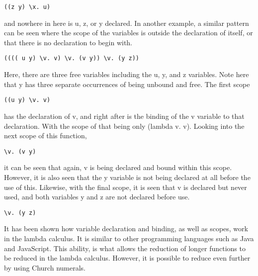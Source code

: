 \documentclass{article}
\begin{document}
\begin{lstlisting}
((z y) \x. u)
\end{lstlisting}
and nowhere in here is u, z, or y declared.
In another example, a similar pattern can be seen where the scope of the variables is outside the declaration of itself, or that there is no declaration to begin with.
\begin{lstlisting}
(((( u y) \v. v) \v. (v y)) \v. (y z))
\end{lstlisting}
Here, there are three free variables including the u, y, and z variables.
Note here that y has three separate occurrences of being unbound and free.
The first scope
\begin{lstlisting}
((u y) \v. v)
\end{lstlisting}
has the declaration of v, and right after is the binding of the v variable to that declaration.
With the scope of that being only (lambda v. v).
Looking into the next scope of this function,
\begin{lstlisting}
\v. (v y)
\end{lstlisting}
it can be seen that again, v is being declared and bound within this scope.
However, it is also seen that the y variable is not being declared at all before the use of this.
Likewise, with the final scope, it is seen that v is declared but never used, and both variables y and z are not declared before use.
\begin{lstlisting}
\v. (y z)
\end{lstlisting}
It has been shown how variable declaration and binding, as well as scopes, work in the lambda calculus. It is similar to other programming languages such as Java and JavaScript.
This ability, is what allows the reduction of longer functions to be reduced in the lambda calculus.
However, it is possible to reduce even further by using Church numerals.
\end{document}
